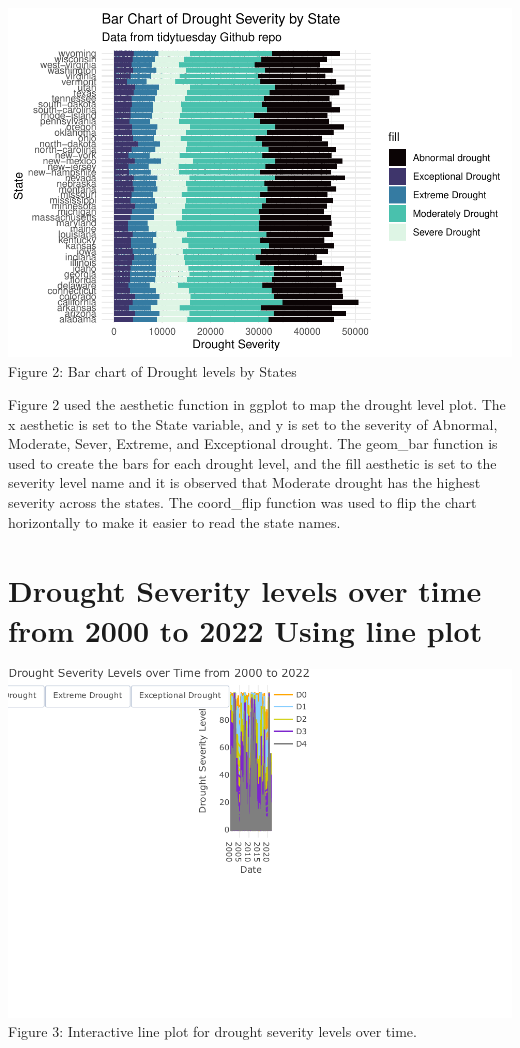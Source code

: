 \documentclass[
]{article}
\begin{document}
\includegraphics{C7083-213221-Markdown_files/figure-latex/Bar Chart of drought severity-1.pdf}
Figure 2: Bar chart of Drought levels by States

Figure 2 used the aesthetic function in ggplot to map the drought level
plot. The x aesthetic is set to the State variable, and y is set to the
severity of Abnormal, Moderate, Sever, Extreme, and Exceptional drought.
The geom\_bar function is used to create the bars for each drought
level, and the fill aesthetic is set to the severity level name and it
is observed that Moderate drought has the highest severity across the
states. The coord\_flip function was used to flip the chart horizontally
to make it easier to read the state names.

\hypertarget{drought-severity-levels-over-time-from-2000-to-2022-using-line-plot}{%
\section{Drought Severity levels over time from 2000 to 2022 Using line
plot}\label{drought-severity-levels-over-time-from-2000-to-2022-using-line-plot}}

\includegraphics{C7083-213221-Markdown_files/figure-latex/Interactive line plot for drought severity levels over time-1.pdf}
Figure 3: Interactive line plot for drought severity levels over time.
\end{document}
